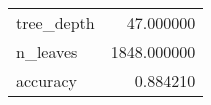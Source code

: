 \begin{tabular}{lr}
\toprule
 &  \\
\midrule
tree\_depth & 47.000000 \\
n\_leaves & 1848.000000 \\
accuracy & 0.884210 \\
\bottomrule
\end{tabular}